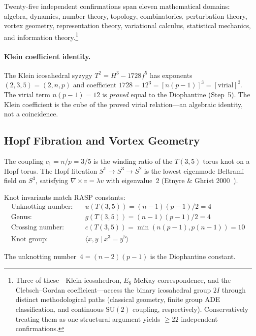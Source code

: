 \documentclass[12pt,a4paper]{article}
\theoremstyle{definition}
\begin{document}
Twenty-five independent confirmations span eleven mathematical domains:
algebra, dynamics, number theory, topology, combinatorics, perturbation
theory, vortex geometry, representation theory, variational calculus,
statistical mechanics, and information theory.\footnote{Three of
these---Klein icosahedron, $E_8$ McKay correspondence, and the
Clebsch--Gordan coefficient---access the binary icosahedral group $2I$
through distinct methodological paths (classical geometry, finite group
ADE classification, and continuous $\mathrm{SU}(2)$ coupling,
respectively). Conservatively treating them as one structural argument
yields $\geq 22$ independent confirmations.}

\paragraph{Klein coefficient identity.}
The Klein icosahedral syzygy $T^2 = H^3 - 1728 f^5$ has exponents
$(2, 3, 5) = (2, n, p)$ and coefficient $1728 = 12^3 = [n(p{-}1)]^3
= [\text{virial}]^3$. The virial term $n(p{-}1) = 12$ is \emph{proved}
equal to the Diophantine (Step~5). The Klein coefficient is the cube
of the proved virial relation---an algebraic identity, not a coincidence.

\subsection{Hopf Fibration and Vortex Geometry}

The coupling $c_1 = n/p = 3/5$ is the winding ratio of the $T(3,5)$ torus
knot on a Hopf torus. The Hopf fibration $S^1 \to S^3 \to S^2$ is the
lowest eigenmode Beltrami field on $S^3$, satisfying $\nabla \times v =
\lambda v$ with eigenvalue~2 (Etnyre \& Ghrist 2000~\cite{etnyre2000}).

Knot invariants match RASP constants:
\begin{align*}
  \text{Unknotting number:}  &\quad u(T(3,5)) = (n-1)(p-1)/2 = 4 \\
  \text{Genus:}              &\quad g(T(3,5)) = (n-1)(p-1)/2 = 4 \\
  \text{Crossing number:}    &\quad c(T(3,5)) = \min(n(p-1),p(n-1)) = 10 \\
  \text{Knot group:}         &\quad \langle x,y \mid x^3 = y^5\rangle
\end{align*}

The unknotting number~$4 = (n-2)(p-1)$ is the Diophantine constant.
\end{document}
